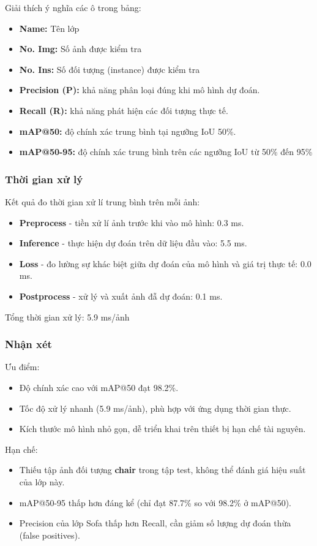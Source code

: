 Giải thích ý nghĩa các ô trong bảng:
\begin{itemize}
    \item \textbf{Name: }Tên lớp
    \item \textbf{No. Img:} Số ảnh được kiểm tra
    \item \textbf{No. Ins: }Số đối tượng (instance) được kiểm tra
    \item \textbf{Precision (P):} khả năng phân loại đúng khi mô hình dự đoán.
    \item \textbf{Recall (R):} khả năng phát hiện các đối tượng thực tế.
    \item \textbf{mAP@50:} độ chính xác trung bình tại ngưỡng IoU 50\%.
    \item \textbf{mAP@50-95:} độ chính xác trung bình trên các ngưỡng IoU từ 50\% đến 95\%
\end{itemize}

\subsubsection{Thời gian xử lý}
Kết quả đo thời gian xử lí trung bình trên mỗi ảnh:
    \begin{itemize}
        \item \textbf{Preprocess} - tiền xử lí ảnh trước khi vào mô hình: 0.3 ms.
        \item \textbf{Inference} - thực hiện dự đoán trên dữ liệu đầu vào: 5.5 ms.
        \item \textbf{Loss} - đo lường sự khác biệt giữa dự đoán của mô hình và giá trị thực tế: 0.0 ms.
        \item \textbf{Postprocess} - xử lý và xuất ảnh đẫ dự đoán: 0.1 ms.
    \end{itemize}
Tổng thời gian xử lý: 5.9 ms/ảnh

\subsubsection{Nhận xét}

Ưu điểm:
\begin{itemize}
    \item Độ chính xác cao với mAP@50 đạt 98.2\%.
    \item Tốc độ xử lý nhanh (5.9 ms/ảnh), phù hợp với ứng dụng thời gian thực.
    \item Kích thước mô hình nhỏ gọn, dễ triển khai trên thiết bị hạn chế tài nguyên.
\end{itemize}
Hạn chế:
\begin{itemize}
    \item Thiếu tập ảnh đối tượng \textbf{chair} trong tập test, không thể đánh giá hiệu suất của lớp này.
    \item mAP@50-95 thấp hơn đáng kể (chỉ đạt 87.7\% so với 98.2\% ở mAP@50).
    \item Precision của lớp Sofa thấp hơn Recall, cần giảm số lượng dự đoán thừa (false positives).
\end{itemize}

